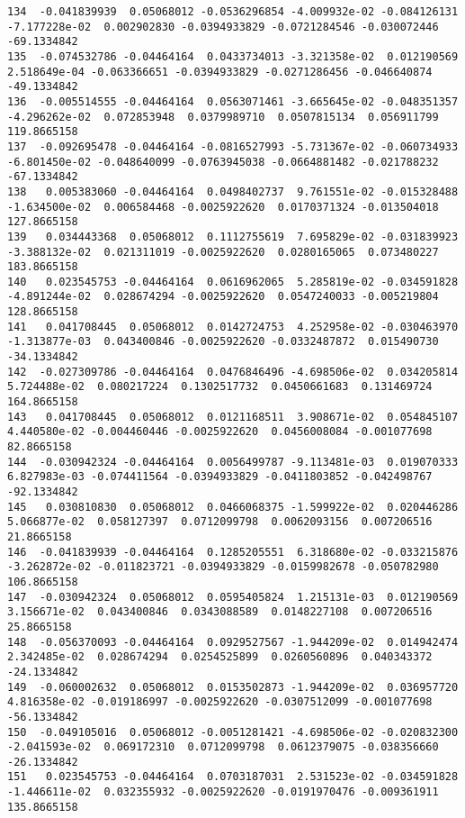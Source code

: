 \documentclass[15pt,a4paper,openright]{article}
\begin{document}
\begin{lstlisting}[language=AMPL, caption = data file]
134  -0.041839939  0.05068012 -0.0536296854 -4.009932e-02 -0.084126131 -7.177228e-02  0.002902830 -0.0394933829 -0.0721284546 -0.030072446  -69.1334842
135  -0.074532786 -0.04464164  0.0433734013 -3.321358e-02  0.012190569  2.518649e-04 -0.063366651 -0.0394933829 -0.0271286456 -0.046640874  -49.1334842
136  -0.005514555 -0.04464164  0.0563071461 -3.665645e-02 -0.048351357 -4.296262e-02  0.072853948  0.0379989710  0.0507815134  0.056911799  119.8665158
137  -0.092695478 -0.04464164 -0.0816527993 -5.731367e-02 -0.060734933 -6.801450e-02 -0.048640099 -0.0763945038 -0.0664881482 -0.021788232  -67.1334842
138   0.005383060 -0.04464164  0.0498402737  9.761551e-02 -0.015328488 -1.634500e-02  0.006584468 -0.0025922620  0.0170371324 -0.013504018  127.8665158
139   0.034443368  0.05068012  0.1112755619  7.695829e-02 -0.031839923 -3.388132e-02  0.021311019 -0.0025922620  0.0280165065  0.073480227  183.8665158
140   0.023545753 -0.04464164  0.0616962065  5.285819e-02 -0.034591828 -4.891244e-02  0.028674294 -0.0025922620  0.0547240033 -0.005219804  128.8665158
141   0.041708445  0.05068012  0.0142724753  4.252958e-02 -0.030463970 -1.313877e-03  0.043400846 -0.0025922620 -0.0332487872  0.015490730  -34.1334842
142  -0.027309786 -0.04464164  0.0476846496 -4.698506e-02  0.034205814  5.724488e-02  0.080217224  0.1302517732  0.0450661683  0.131469724  164.8665158
143   0.041708445  0.05068012  0.0121168511  3.908671e-02  0.054845107  4.440580e-02 -0.004460446 -0.0025922620  0.0456008084 -0.001077698   82.8665158
144  -0.030942324 -0.04464164  0.0056499787 -9.113481e-03  0.019070333  6.827983e-03 -0.074411564 -0.0394933829 -0.0411803852 -0.042498767  -92.1334842
145   0.030810830  0.05068012  0.0466068375 -1.599922e-02  0.020446286  5.066877e-02  0.058127397  0.0712099798  0.0062093156  0.007206516   21.8665158
146  -0.041839939 -0.04464164  0.1285205551  6.318680e-02 -0.033215876 -3.262872e-02 -0.011823721 -0.0394933829 -0.0159982678 -0.050782980  106.8665158
147  -0.030942324  0.05068012  0.0595405824  1.215131e-03  0.012190569  3.156671e-02  0.043400846  0.0343088589  0.0148227108  0.007206516   25.8665158
148  -0.056370093 -0.04464164  0.0929527567 -1.944209e-02  0.014942474  2.342485e-02  0.028674294  0.0254525899  0.0260560896  0.040343372  -24.1334842
149  -0.060002632  0.05068012  0.0153502873 -1.944209e-02  0.036957720  4.816358e-02 -0.019186997 -0.0025922620 -0.0307512099 -0.001077698  -56.1334842
150  -0.049105016  0.05068012 -0.0051281421 -4.698506e-02 -0.020832300 -2.041593e-02  0.069172310  0.0712099798  0.0612379075 -0.038356660  -26.1334842
151   0.023545753 -0.04464164  0.0703187031  2.531523e-02 -0.034591828 -1.446611e-02  0.032355932 -0.0025922620 -0.0191970476 -0.009361911  135.8665158

\end{lstlisting}
\end{document}
